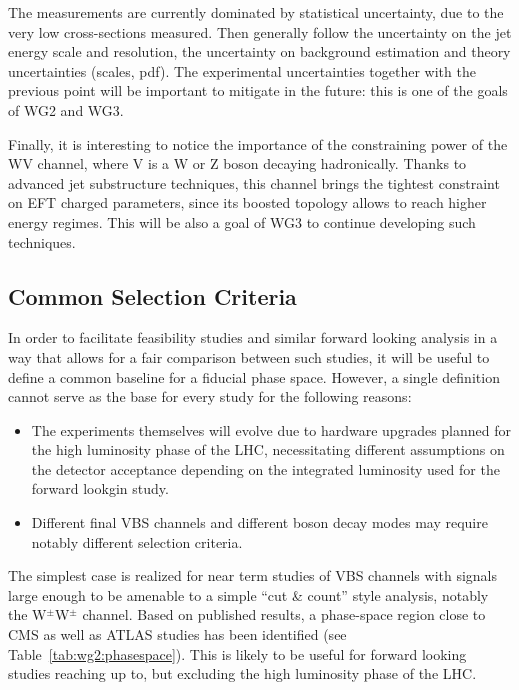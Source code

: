 The measurements are currently dominated by statistical uncertainty, due to the very low cross-sections measured. Then generally follow the uncertainty on the jet energy scale and resolution, the uncertainty on background estimation and theory uncertainties (scales, pdf). The experimental uncertainties together with the previous point will be  important to mitigate in the future: this is one of the goals of WG2 and WG3.
 
Finally, it is interesting to notice the importance of the constraining power of the WV channel, where V is a W or Z boson decaying hadronically. Thanks to advanced jet substructure techniques, this channel brings the tightest constraint on EFT charged parameters, since its boosted topology allows to reach higher energy regimes. This will be also a goal of WG3 to continue developing such techniques. 
\subsection{Common Selection Criteria}

In order to facilitate feasibility studies and similar forward looking analysis in a way that allows for a fair comparison between such studies, it will be useful to define a common baseline for a fiducial phase space. However, a single definition cannot serve as the base for every study for the following reasons:
\begin{itemize}
\item The experiments themselves will evolve due to hardware upgrades planned for the high luminosity phase of the LHC, necessitating different assumptions on the detector acceptance depending on the integrated luminosity used for the forward lookgin study.
\item Different final VBS channels and different boson decay modes may require notably different selection criteria.
\end{itemize}

The simplest case is realized for near term studies of VBS channels with signals large enough to be amenable to a simple ``cut \& count'' style analysis, notably the W$^\pm$W$^\pm$ channel. Based on published results, a phase-space region close to CMS as well as ATLAS studies has been identified (see Table~\ref{tab:wg2:phasespace}). This is likely to be useful for forward looking studies reaching up to, but excluding the high luminosity phase of the LHC.

